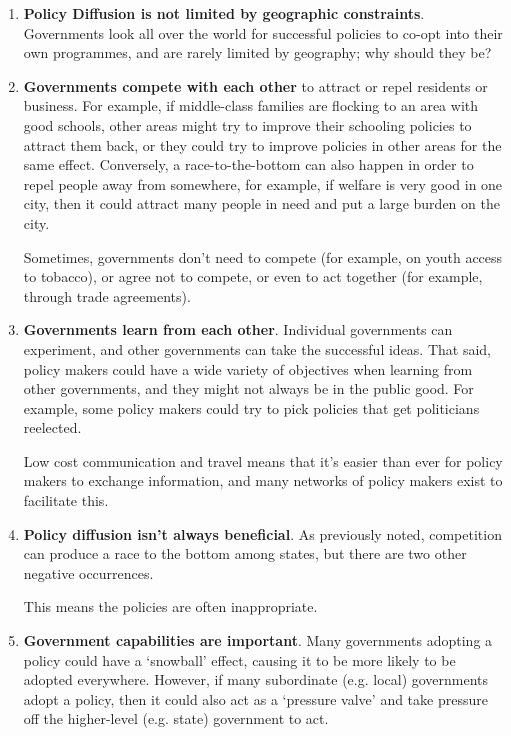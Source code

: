 \begin{enumerate}
  \item \textbf{Policy Diffusion is not limited by geographic
      constraints}. Governments look all over the world for successful
    policies to co-opt into their own programmes, and are rarely
    limited by geography; why should they be?
  \item \textbf{Governments compete with each other} to attract or
    repel residents or business. For example, if middle-class
    families are flocking to an area with good schools, other areas
    might try to improve their schooling policies to attract them
    back, or they could try to improve policies in other areas for the
    same effect. Conversely, a race-to-the-bottom can also happen in
    order to repel people away from somewhere, for example, if welfare
    is very good in one city, then it could attract many people in
    need and put a large burden on the city.

    Sometimes, governments don't need to compete (for example, on
    youth access to tobacco), or agree not to compete, or even to act
    together (for example, through trade agreements).
  \item \textbf{Governments learn from each other}. Individual
    governments can experiment, and other governments can take the
    successful ideas. That said, policy makers could have a wide
    variety of objectives when learning from other governments, and
    they might not always be in the public good. For example, some
    policy makers could try to pick policies that get politicians
    reelected.

    Low cost communication and travel means that it's easier than ever
    for policy makers to exchange information, and many networks of
    policy makers exist to facilitate this.
  \item \textbf{Policy diffusion isn't always beneficial}. As
    previously noted, competition can produce a race to the bottom
    among states, but there are two other negative occurrences.

     This means the policies are often
    inappropriate.

  \item \textbf{Government capabilities are important}. Many
    governments adopting a policy could have a `snowball' effect,
    causing it to be more likely to be adopted everywhere. However, if
    many subordinate (e.g. local) governments adopt a policy, then it
    could also act as a `pressure valve' and take pressure off the
    higher-level (e.g. state) government to act.


\end{enumerate}
